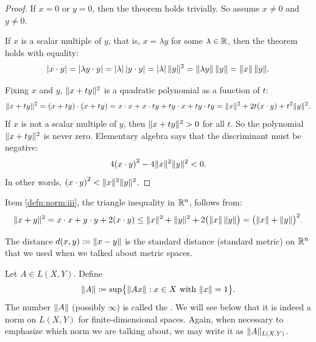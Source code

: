 \begin{proof}
If $x=0$ or $y = 0$, then the theorem holds trivially.
So assume $x\not= 0$ and $y \not= 0$.

If $x$ is a scalar multiple of $y$, that is, $x = \lambda y$ for some
$\lambda \in {\mathbb{R}}$, then the theorem holds with equality:
\begin{equation*}
\lvert { x \cdot y } \rvert =
\lvert {\lambda y \cdot y} \rvert = \lvert {\lambda} \rvert \, \lvert {y\cdot y} \rvert =
\lvert {\lambda} \rvert \, \lVert {y} \rVert^2 = \lVert {\lambda y} \rVert \, \lVert {y} \rVert
= \lVert {x} \rVert \, \lVert {y} \rVert .
\end{equation*}

Fixing $x$ and $y$,
$\lVert {x+ty} \rVert^2$
is a quadratic polynomial
as a function of $t$:
\begin{equation*}
\lVert {x+ty} \rVert^2 =
(x+ty) \cdot (x+ty) =
x \cdot x + x \cdot ty + ty \cdot x + ty \cdot ty
=
\lVert {x} \rVert^2 + 2t(x \cdot y) + t^2 \lVert {y} \rVert^2 .
\end{equation*}
If $x$ is not a scalar multiple of $y$, then 
$\lVert {x+ty} \rVert^2 > 0$ for all $t$.  So the polynomial $\lVert {x+ty} \rVert^2$
is never zero.
Elementary algebra says that the discriminant must be negative:
\begin{equation*}
4 {(x \cdot y)}^2 - 4 \lVert {x} \rVert^2\lVert {y} \rVert^2 < 0.
\end{equation*}
In other words, ${(x \cdot y)}^2 < \lVert {x} \rVert^2\lVert {y} \rVert^2$.
\end{proof}

Item \ref{defn:norm:iii}, the triangle inequality in ${\mathbb{R}}^n$,
follows from:
\begin{equation*}
\lVert {x+y} \rVert^2 
=
x \cdot x + y \cdot y + 2 (x \cdot y)
\leq
\lVert {x} \rVert^2 + \lVert {y} \rVert^2 + 2 \bigl(\lVert {x} \rVert \,\lVert {y} \rVert\bigr)
=
{\bigl(\lVert {x} \rVert + \lVert {y} \rVert\bigr)}^2 .
\end{equation*}

The distance
$d(x,y) \coloneqq \lVert {x-y} \rVert$ is the standard
distance (standard metric) on ${\mathbb{R}}^n$ that
we used when we talked about metric spaces.

\begin{defn}
Let $A \in L(X,Y)$.  Define
\begin{equation*}
\lVert {A} \rVert \coloneqq
\sup \bigl\{ \lVert {Ax} \rVert : x \in X \text{ with } \lVert {x} \rVert = 1 \bigr\} .
\end{equation*}
The number $\lVert {A} \rVert$ (possibly $\infty$)
is called the \emph{}.  We will see below
that it is indeed a norm on $L(X,Y)$ for finite-dimensional spaces.
Again, when necessary to emphasize which norm we are talking about, we may
write it as $\lVert {A} \rVert_{L(X,Y)}$.
\end{defn}

